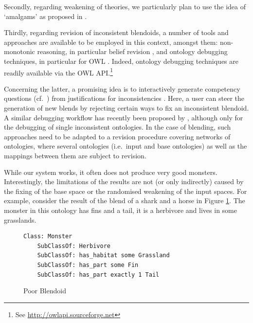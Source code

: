 \documentclass[letterpaper]{article}
\begin{document}
Secondly, regarding weakening of theories, we particularly plan to use the idea of `amalgams' as proposed in \cite{ontanon2010amalgams}. 

Thirdly, regarding revision of inconsistent blendoids, a number of tools and approaches are available to be employed in this context, amongst them: non-monotonic reasoning, in particular belief revision \citep{Alchourron85a}, and ontology debugging techniques, in particular for OWL \citep{Kaly05}. Indeed, ontology debugging techniques are readily available via the OWL API.\footnote{See \url{http://owlapi.sourceforge.net}} %

 Concerning the latter, a promising idea is to interactively generate competency questions (cf.\ \cite{gruninger1995role,ren2014towards}) from justifications for inconsistencies \citep{Kalyanpur:2007:Finding}. Here, a user can steer the generation of new blends by rejecting certain ways to fix an inconsistent blendoid. A similar debugging workflow has recently been proposed by \cite{intontdebug14}, although only for the debugging of single inconsistent ontologies. In the case of blending, such approaches need to be adapted to a revision procedure covering networks of ontologies, where several ontologies (i.e.\ input and base ontologies) as well as the mappings between them are subject to revision.






While our system works, it often does not produce very  good monsters. 
Interestingly, the limitations of the results are not (or only indirectly) caused
 by the fixing of the base space or the randomised weakening of the input spaces. 
 For example, consider the result of the blend of a shark and a horse in Figure \ref{outputExample}. 
 The monster in this ontology has  fins and a tail,  it is a  herbivore and  lives in some grasslands. 
 \begin{figure}[htbp]
\begin{lstlisting}[basicstyle=\ttfamily\scriptsize,language=dolText,morekeywords={props,excluding,ObjectProperty,
Class,DisjointUnionOf,SubClassOf,Characteristics,Transitive,Asymmetric,SubPropertyOf,
DisjointClasses,EquivalentTo,Asymmetric,inverse,only,forall,iff,if,or,exists,
bridge,distributed},escapechar=@,mathescape,alsolanguage=owl2Manchester]
Class: Monster
	SubClassOf: Herbivore 
	SubClassOf: has_habitat some Grassland
	SubClassOf: has_part some Fin 
	SubClassOf: has_part exactly 1 Tail  
\end{lstlisting}
\caption{Poor Blendoid}
\label{outputExample}
\end{figure}
\vspace{-2em}
\end{document}
